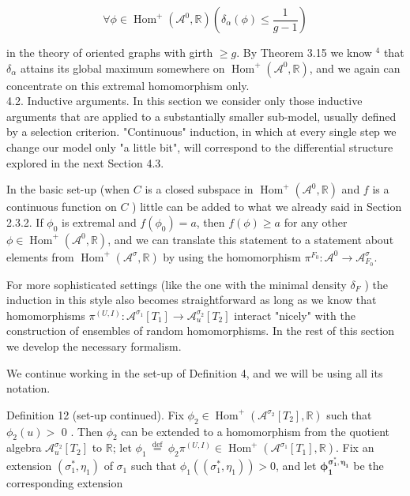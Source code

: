 \documentclass[10pt]{article}
\begin{document}
$$
\forall \phi \in \operatorname{Hom}^{+}\left(\mathcal{A}^{0}, \mathbb{R}\right)\left(\delta_{\alpha}(\phi) \leq \frac{1}{g-1}\right)
$$

in the theory of oriented graphs with girth $\geq g$. By Theorem 3.15 we know ${ }^{4}$ that $\delta_{\alpha}$ attains its global maximum somewhere on $\operatorname{Hom}^{+}\left(\mathcal{A}^{0}, \mathbb{R}\right)$, and we again can concentrate on this extremal homomorphism only.\\
4.2. Inductive arguments. In this section we consider only those inductive arguments that are applied to a substantially smaller sub-model, usually defined by a selection criterion. "Continuous" induction, in which at every single step we change our model only "a little bit", will correspond to the differential structure explored in the next Section 4.3.

In the basic set-up (when $C$ is a closed subspace in $\operatorname{Hom}^{+}\left(\mathcal{A}^{0}, \mathbb{R}\right)$ and $f$ is a continuous function on $C$ ) little can be added to what we already said in Section 2.3.2. If $\phi_{0}$ is extremal and $f\left(\phi_{0}\right)=a$, then $f(\phi) \geq a$ for any other $\phi \in \operatorname{Hom}^{+}\left(\mathcal{A}^{0}, \mathbb{R}\right)$, and we can translate this statement to a statement about elements from $\operatorname{Hom}^{+}\left(\mathcal{A}^{\sigma}, \mathbb{R}\right)$ by using the homomorphism $\pi^{F_{0}}: \mathcal{A}^{0} \longrightarrow \mathcal{A}_{F_{0}}^{\sigma}$.

For more sophisticated settings (like the one with the minimal density $\delta_{F}$ ) the induction in this style also becomes straightforward as long as we know that homomorphisms $\pi^{(U, I)}: \mathcal{A}^{\sigma_{1}}\left[T_{1}\right] \longrightarrow \mathcal{A}_{u}^{\sigma_{2}}\left[T_{2}\right]$ interact "nicely" with the construction of ensembles of random homomorphisms. In the rest of this section we develop the necessary formalism.

We continue working in the set-up of Definition 4, and we will be using all its notation.

Definition 12 (set-up continued). Fix $\phi_{2} \in \operatorname{Hom}^{+}\left(\mathcal{A}^{\sigma_{2}}\left[T_{2}\right], \mathbb{R}\right)$ such that $\phi_{2}(u)>$ 0 . Then $\phi_{2}$ can be extended to a homomorphism from the quotient algebra $\mathcal{A}_{u}^{\sigma_{2}}\left[T_{2}\right]$ to $\mathbb{R}$; let $\phi_{1} \stackrel{\text { def }}{=} \phi_{2} \pi^{(U, I)} \in \operatorname{Hom}^{+}\left(\mathcal{A}^{\sigma_{1}}\left[T_{1}\right], \mathbb{R}\right)$. Fix an extension $\left(\sigma_{1}^{*}, \eta_{1}\right)$ of $\sigma_{1}$ such that $\phi_{1}\left(\left(\sigma_{1}^{*}, \eta_{1}\right)\right)>0$, and let $\boldsymbol{\phi}_{\mathbf{1}}^{\boldsymbol{\sigma}_{\mathbf{1}}^{*}, \boldsymbol{\eta}_{\mathbf{1}}}$ be the corresponding extension
\end{document}

